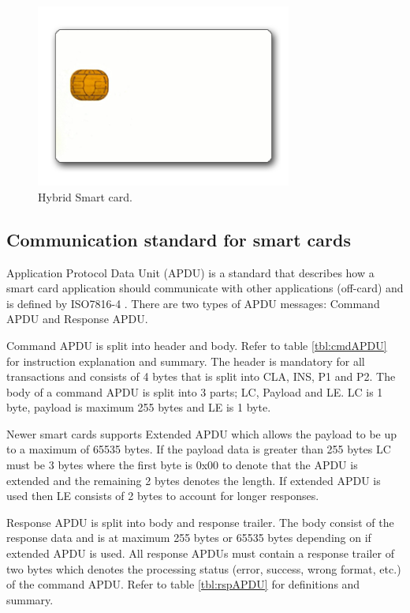 \begin{figure}[h!]
  \caption{Hybrid Smart card.}
  \label{fig:nfccard}
  \centering
    \includegraphics[width=0.75\textwidth]{images/nfccard2.png}
\end{figure}

\subsection{Communication standard for smart cards}
\label{sec:communicationstandard}
Application Protocol Data Unit (APDU) is a standard that describes how a smart card application should communicate with other applications (off-card) and is defined by ISO7816-4 \cite{iso7816-4}. There are two types of APDU messages: Command APDU and Response APDU.

Command APDU is split into header and body. Refer to table \ref{tbl:cmdAPDU} for instruction explanation and summary. The header is mandatory for all transactions and consists of 4 bytes that is split into CLA, INS, P1 and P2. The body of a command APDU is split into 3 parts; LC, Payload and LE. LC is 1 byte, payload is maximum 255 bytes and LE is 1 byte.

Newer smart cards supports Extended APDU which allows the payload to be up to a maximum of 65535 bytes. If the payload data is greater than 255 bytes LC must be 3 bytes where the first byte is 0x00 to denote that the APDU is extended and the remaining 2 bytes denotes the length. If extended APDU is used then LE consists of 2 bytes to account for longer responses.


Response APDU is split into body and response trailer. The body consist of the response data and is at maximum 255 bytes or 65535 bytes depending on if extended APDU is used. All response APDUs must contain a response trailer of two bytes which denotes the processing status (error, success, wrong format, etc.) of the command APDU. Refer to table \ref{tbl:rspAPDU} for definitions and summary.


